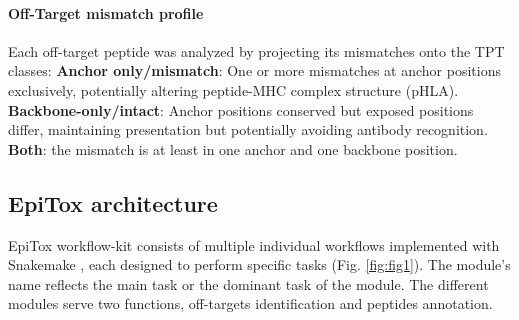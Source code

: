 \documentclass[times, twoside, watermark]{zHenriquesLab-StyleBioRxiv}
\begin{document}
        \paragraph{Off-Target mismatch profile}
            Each off-target peptide was analyzed by projecting its mismatches onto the TPT classes: \textbf{Anchor only/mismatch}: One or more mismatches at anchor positions exclusively, potentially altering peptide-MHC complex structure (pHLA). \textbf{Backbone-only/intact}: Anchor positions conserved but exposed positions differ, maintaining presentation but potentially avoiding antibody recognition. \textbf{Both}: the mismatch is at least in one anchor and one backbone position.
    
    \subsection{EpiTox architecture}\label{methods:epitox} 
        EpiTox workflow-kit consists of multiple individual workflows implemented with Snakemake \cite{molder2025sustainable}, each designed to perform specific tasks (Fig. \ref{fig:fig1}). The module’s name reflects the main task or the dominant task of the module. The different modules serve two functions, off-targets identification and peptides annotation. 
\end{document}
